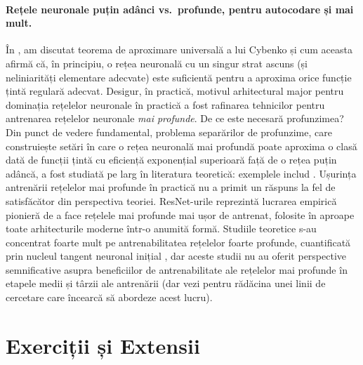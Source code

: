 \documentclass[../../book-main_ro.tex]{subfiles}
\begin{document}
\paragraph{Rețele neuronale puțin adânci vs.\ profunde, pentru autocodare și mai mult.}
În , am discutat teorema de aproximare universală a lui Cybenko
și cum aceasta afirmă că, în principiu, o rețea neuronală cu un singur
strat ascuns (și neliniarități elementare adecvate) este suficientă pentru
a aproxima orice funcție țintă regulară adecvat. Desigur, în practică,
motivul arhitectural major pentru dominația rețelelor neuronale în practică a fost
rafinarea tehnicilor pentru antrenarea rețelelor neuronale \textit{mai profunde}.
De ce este necesară profunzimea?
Din punct de vedere fundamental, problema separărilor de profunzime, care
construiește setări în care o rețea neuronală mai profundă poate aproxima o clasă dată
de funcții țintă cu eficiență exponențial superioară față de o rețea
puțin adâncă,
a fost studiată pe larg în literatura teoretică:
exemplele includ \cite{Telgarsky2016-sn,Bresler2020-xy,Venturi2021-qc}.
Ușurința antrenării rețelelor mai profunde
în practică nu a primit un răspuns la fel de satisfăcător din
perspectiva teoriei.
ResNet-urile \cite{he2016deep} reprezintă lucrarea empirică pionieră de
a face rețelele mai profunde mai ușor de antrenat, folosite în aproape toate arhitecturile
moderne într-o anumită formă. Studiile teoretice s-au concentrat foarte mult pe
antrenabilitatea rețelelor foarte profunde, cuantificată prin nucleul tangent neuronal
inițial \cite{Buchanan2021-sj,Martens2021-cx}, dar aceste studii nu au oferit
perspective semnificative asupra beneficiilor de antrenabilitate ale rețelelor mai profunde în etapele
medii și târzii ale antrenării (dar vezi \cite{Yang2021-gw} pentru rădăcina unei linii
de cercetare care încearcă să abordeze acest lucru).

\section{Exerciții și Extensii}
\end{document}
